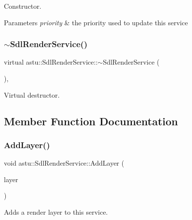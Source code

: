 Constructor.


\begin{DoxyParams}{Parameters}
{\em priority} & the priority used to update this service \\
\hline
\end{DoxyParams}
\mbox{\label{classastu_1_1SdlRenderService_a0ec8c27982cfa6ace6b28e50fba78f2a}} 
\subsubsection{\texorpdfstring{$\sim$\+Sdl\+Render\+Service()}{~SdlRenderService()}}
{\footnotesize\ttfamily virtual astu\+::\+Sdl\+Render\+Service\+::$\sim$\+Sdl\+Render\+Service (\begin{DoxyParamCaption}{ }\end{DoxyParamCaption})\hspace{0.3cm}{\ttfamily [inline]}, {\ttfamily [virtual]}}

Virtual destructor. 

\subsection{Member Function Documentation}
\mbox{\label{classastu_1_1SdlRenderService_af025dba6e6ada1f09badaa6de75292d1}} 
\subsubsection{\texorpdfstring{Add\+Layer()}{AddLayer()}}
{\footnotesize\ttfamily void astu\+::\+Sdl\+Render\+Service\+::\+Add\+Layer (\begin{DoxyParamCaption}\item[{std\+::shared\+\_\+ptr$<$ \hyperlink{classastu_1_1ISdlRenderLayer}{I\+Sdl\+Render\+Layer} $>$}]{layer }\end{DoxyParamCaption})}

Adds a render layer to this service.


